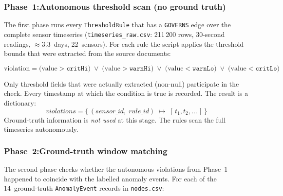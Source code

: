 ﻿\documentclass[11pt]{article}
\begin{document}
\subsubsection{Phase~1:Autonomous threshold scan (no ground truth)}

The first phase runs every \texttt{ThresholdRule} that has a
\texttt{GOVERNS} edge over the complete sensor timeseries
(\texttt{timeseries\_raw.csv}: 211\,200 rows, 30-second readings, $\approx$3.3~days,
22~sensors).  For each rule the script applies the threshold bounds that were
extracted from the source documents:

\[
  \text{violation} =
    \bigl(\text{value} > \mathtt{critHi}\bigr)
    \;\lor\; \bigl(\text{value} > \mathtt{warnHi}\bigr)
    \;\lor\; \bigl(\text{value} < \mathtt{warnLo}\bigr)
    \;\lor\; \bigl(\text{value} < \mathtt{critLo}\bigr)
\]

Only threshold fields that were actually extracted (non-null) participate in
the check.  Every timestamp at which the condition is true is recorded.
The result is a dictionary:
\[
  \textit{violations} = \bigl\{\,
    (\textit{sensor\_id},\; \textit{rule\_id}) \;\mapsto\; [\,t_1, t_2, \ldots\,]
  \,\bigr\}
\]
Ground-truth information is \emph{not used} at this stage.  The rules scan the
full timeseries autonomously.

\subsubsection{Phase~2:Ground-truth window matching}

The second phase checks whether the autonomous violations from Phase~1 happened
to coincide with the labelled anomaly events.  For each of the 14~ground-truth
\texttt{AnomalyEvent} records in \texttt{nodes.csv}:
\end{document}
